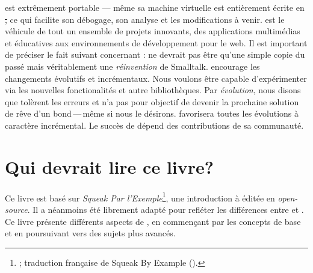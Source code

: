 \documentclass[a4paper,10pt,twoside]{book}
\begin{document}
\pharo est extrêmement portable --- même sa machine virtuelle est
entièrement écrite en \st, ce qui facilite son débogage, son
analyse et les modifications à venir. \pharo est le véhicule de tout
un ensemble de projets innovants, des applications multimédias et
éducatives aux environnements de développement pour le web.
Il est important de préciser le fait suivant concernant \pharo: 
\pharo ne devrait pas être qu'une simple copie du passé mais véritablement
une \emph{réinvention} de Smalltalk.  \pharo encourage les changements évolutifs et
incrémentaux. Nous voulons être capable d'expérimenter via les
nouvelles fonctionalités et autre bibliothèques. Par \emph{évolution},
nous disons que \pharo tolèrent les erreurs et n'a pas pour objectif
de devenir la prochaine solution de rêve d'un bond\,---\,même si nous
le désirons.
\pharo favorisera toutes les évolutions à caractère incrémental. 
Le succès de \pharo dépend des contributions de sa communauté.

\section*{Qui devrait lire ce livre?}

Ce livre est basé sur \emph{Squeak Par l'Exemple}\footnote{\spe;
  traduction française de Squeak By Example (\sbe).}, une introduction
à \squeak éditée en \emph{open-source}. Il a néanmoins été librement
adapté pour refléter les différences entre \pharo et \squeak. Ce livre 
présente différents aspects de \pharo, en commençant par les concepts 
de base et en poursuivant vers des sujets plus avancés.
\end{document}

